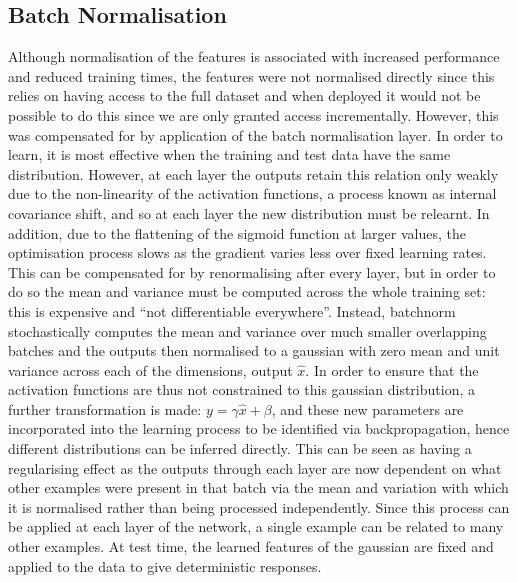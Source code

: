 \subsection{Batch Normalisation}
Although normalisation of the features is associated with increased performance and reduced training times, the features were not normalised directly since this relies on having access to the full dataset and when deployed it would not be possible to do this since we are only granted access incrementally. However, this was compensated for by application of the batch normalisation layer. In order to learn, it is most effective when the training and test data have the same distribution. However, at each layer the outputs retain this relation only weakly due to the non-linearity of the activation functions, a process known as internal covariance shift, and so at each layer the new distribution must be relearnt. In addition, due to the flattening of the sigmoid function at larger values, the optimisation process slows as the gradient varies less over fixed learning rates. This can be compensated for by renormalising after every layer, but in order to do so the mean and variance must be computed across the whole training set: this is expensive and “not differentiable everywhere”. Instead, batchnorm stochastically computes the mean and variance over much smaller overlapping batches and the outputs then normalised to a gaussian with zero mean and unit variance across each of the dimensions, output $\hat{x}$. In order to ensure that the activation functions are thus not constrained to this gaussian distribution, a further transformation is made: $y = \gamma  \hat{x} + \beta$, and these new parameters are incorporated into the learning process to be identified via backpropagation, hence different distributions can be inferred directly. This can be seen as having a regularising effect as the outputs through each layer are now dependent on what other examples were present in that batch via the mean and variation with which it is normalised rather than being processed independently. Since this process can be applied at each layer of the network, a single example can be related to many other examples. At test time, the learned features of the gaussian are fixed and applied to the data to give deterministic responses.

